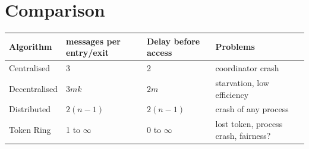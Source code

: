 \documentclass[ngerman,a4paper]{report}
\begin{document}
\section{Comparison}
\begin{tabular} {l|l|l|l}
Algorithm&messages per entry/exit&Delay before access&Problems\\
\hline
Centralised& 3& 2&coordinator crash\\
Decentralised&$3mk$&$2m$&starvation, low efficiency\\
Distributed&$2(n-1)$&$2(n-1)$&crash of any process\\
Token Ring& 1 to $\infty$&$0$ to $\infty$&lost token, process crash, fairness?
\end{tabular}



%
%
%
%
\end{document}
